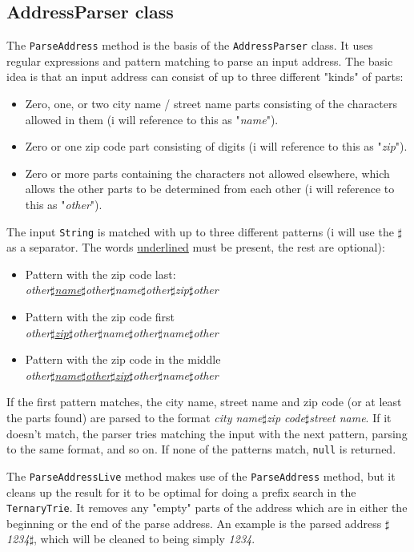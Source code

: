 \documentclass[a4paper,11pt]{article}
\begin{document}
\subsection{AddressParser class}
The \texttt{ParseAddress} method is the basis of the \texttt{AddressParser} class. It uses regular expressions and pattern matching to parse an input address. The basic idea is that an input address can consist of up to three different "kinds" of parts:
\begin{itemize}
	\item Zero, one, or two city name / street name parts consisting of the characters allowed in them (i will reference to this as "\textit{name}").
	\item Zero or one zip code part consisting of digits (i will reference to this as "\textit{zip}").
	\item Zero or more parts containing the characters not allowed elsewhere, which allows the other parts to be determined from each other (i will reference to this as "\textit{other}").
\end{itemize}
The input \texttt{String} is matched with up to three different patterns (i will use the $\sharp$ as a separator. The words \underline{underlined} must be present, the rest are optional):
\begin{itemize}
	\item Pattern with the zip code last: \\
		\textit{other$\sharp$\underline{name}$\sharp$other$\sharp$name$\sharp$other$\sharp$zip$\sharp$other}
	\item Pattern with the zip code first \\
	\textit{other$\sharp$\underline{zip}$\sharp$other$\sharp$name$\sharp$other$\sharp$name$\sharp$other}
	\item Pattern with the zip code in the middle \\
	\textit{other$\sharp$\underline{name$\sharp$other$\sharp$zip}$\sharp$other$\sharp$name$\sharp$other}
\end{itemize}
If the first pattern matches, the city name, street name and zip code (or at least the parts found) are parsed to the format \textit{city name$\sharp$zip code$\sharp$street name}. If it doesn't match, the parser tries matching the input with the next pattern, parsing to the same format, and so on. If none of the patterns match, \texttt{null} is returned.

The \texttt{ParseAddressLive} method makes use of the \texttt{ParseAddress} method, but it cleans up the result for it to be optimal for doing a prefix search in the \texttt{TernaryTrie}. It removes any "empty" parts of the address which are in either the beginning or the end of the parse address. An example is the parsed address \textit{$\sharp$1234$\sharp$}, which will be cleaned to being simply \textit{1234}.
\end{document}
